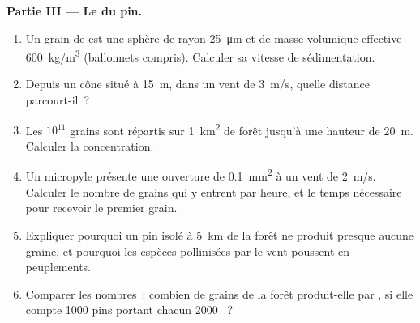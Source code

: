 \begin{problem}
\medskip
\noindent\textbf{Partie III --- Le  du pin.}
\begin{enumerate}[resume]
  \item Un grain de  est une sphère de rayon \qty{25}{\micro m} et
        de masse volumique effective \qty{600}{kg/m^3} (ballonnets
        compris). Calculer sa vitesse de sédimentation.
  \item Depuis un cône situé à \qty{15}{m}, dans un vent de
        \qty{3}{m/s}, quelle distance parcourt-il~?
  \item Les $10^{11}$ grains sont répartis sur \qty{1}{km^2} de forêt
        jusqu'à une hauteur de \qty{20}{m}. Calculer la concentration.
  \item Un micropyle présente une ouverture de \qty{0.1}{mm^2} à un vent
        de \qty{2}{m/s}. Calculer le nombre de grains qui y entrent par
        heure, et le temps nécessaire pour recevoir le premier grain.
  \item Expliquer pourquoi un pin isolé à \qty{5}{km} de la forêt ne
        produit presque aucune graine, et pourquoi les espèces
        pollinisées par le vent poussent en peuplements.
  \item Comparer les nombres~: combien de grains de  la forêt
        produit-elle par , si elle compte \num{1000} pins portant
        chacun \num{2000} ~?
\end{enumerate}


\end{problem}
